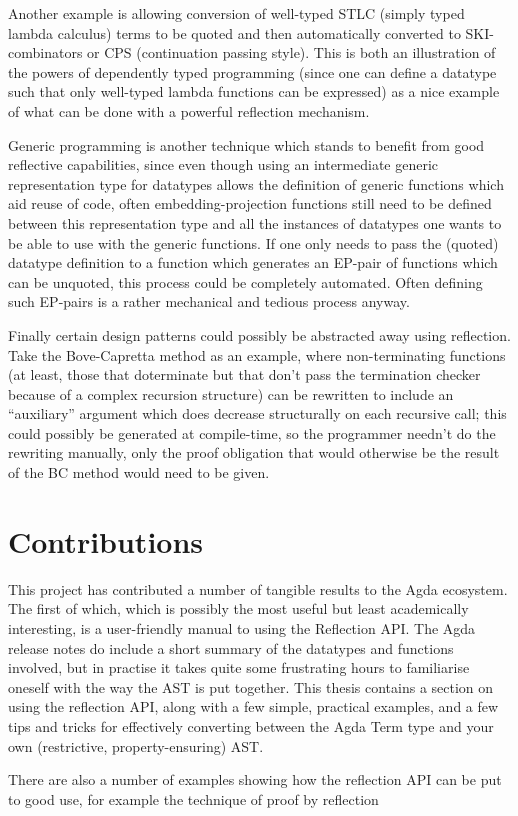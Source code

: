 \documentclass[a4paper]{article}
\begin{document}
Another example is allowing conversion of well-typed STLC (simply typed lambda calculus) terms to be quoted and
then automatically converted to SKI-combinators or CPS (continuation passing style). This is both an illustration of
the powers of dependently typed programming (since one can define a datatype such that only well-typed lambda
functions can be expressed) as a nice example of what can be done with a powerful reflection mechanism.

Generic programming is another technique which stands to benefit from good reflective capabilities, since even
though using an intermediate generic representation type for datatypes allows the definition of generic functions
which aid reuse of code, often embedding-projection functions still need to be defined between this representation type
and all the instances of datatypes one wants to be able to use with the generic functions. If one only needs to
pass the (quoted) datatype definition to a function which generates an EP-pair of functions which can be unquoted,
this process could be completely automated. Often defining such EP-pairs is a rather mechanical and tedious process
anyway.

Finally certain design patterns could possibly be abstracted away using reflection. Take the Bove-Capretta method
as an example, where non-terminating functions (at least, those that doterminate but that don't pass the
termination checker because of a complex recursion structure) can be rewritten to include an ``auxiliary'' argument
which does decrease structurally on each recursive call; this could possibly be generated at compile-time, so
the programmer needn't do the rewriting manually, only the proof obligation that would otherwise be the result of the
BC method would need to be given.


\section{Contributions}


This project has contributed a number of tangible results to the Agda ecosystem. The first of which, which is possibly
the most useful but least academically interesting, is a user-friendly manual to using the Reflection API. The Agda
release notes do include a short summary of the datatypes and functions involved, but in practise it takes quite some
frustrating hours to familiarise oneself with the way the AST is put together. This thesis contains a section on
using the reflection API, along with a few simple, practical examples, and a few tips and tricks for effectively
converting between the Agda Term type and your own (restrictive, property-ensuring) AST.

There are also a number of examples showing how the reflection API can be put to good use, for example the 
technique of proof by reflection
\end{document}
